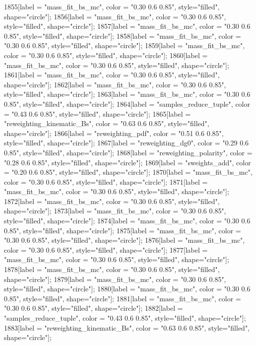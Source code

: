 {	1855[label = "mass_fit_bs_mc", color = "0.30 0.6 0.85", style="filled", shape="circle"];
	1856[label = "mass_fit_bs_mc", color = "0.30 0.6 0.85", style="filled", shape="circle"];
	1857[label = "mass_fit_bs_mc", color = "0.30 0.6 0.85", style="filled", shape="circle"];
	1858[label = "mass_fit_bs_mc", color = "0.30 0.6 0.85", style="filled", shape="circle"];
	1859[label = "mass_fit_bs_mc", color = "0.30 0.6 0.85", style="filled", shape="circle"];
	1860[label = "mass_fit_bs_mc", color = "0.30 0.6 0.85", style="filled", shape="circle"];
	1861[label = "mass_fit_bs_mc", color = "0.30 0.6 0.85", style="filled", shape="circle"];
	1862[label = "mass_fit_bs_mc", color = "0.30 0.6 0.85", style="filled", shape="circle"];
	1863[label = "mass_fit_bs_mc", color = "0.30 0.6 0.85", style="filled", shape="circle"];
	1864[label = "samples_reduce_tuple", color = "0.43 0.6 0.85", style="filled", shape="circle"];
	1865[label = "reweighting_kinematic_Bs", color = "0.63 0.6 0.85", style="filled", shape="circle"];
	1866[label = "reweighting_pdf", color = "0.51 0.6 0.85", style="filled", shape="circle"];
	1867[label = "reweighting_dg0", color = "0.29 0.6 0.85", style="filled", shape="circle"];
	1868[label = "reweighting_polarity", color = "0.28 0.6 0.85", style="filled", shape="circle"];
	1869[label = "sweights_add", color = "0.20 0.6 0.85", style="filled", shape="circle"];
	1870[label = "mass_fit_bs_mc", color = "0.30 0.6 0.85", style="filled", shape="circle"];
	1871[label = "mass_fit_bs_mc", color = "0.30 0.6 0.85", style="filled", shape="circle"];
	1872[label = "mass_fit_bs_mc", color = "0.30 0.6 0.85", style="filled", shape="circle"];
	1873[label = "mass_fit_bs_mc", color = "0.30 0.6 0.85", style="filled", shape="circle"];
	1874[label = "mass_fit_bs_mc", color = "0.30 0.6 0.85", style="filled", shape="circle"];
	1875[label = "mass_fit_bs_mc", color = "0.30 0.6 0.85", style="filled", shape="circle"];
	1876[label = "mass_fit_bs_mc", color = "0.30 0.6 0.85", style="filled", shape="circle"];
	1877[label = "mass_fit_bs_mc", color = "0.30 0.6 0.85", style="filled", shape="circle"];
	1878[label = "mass_fit_bs_mc", color = "0.30 0.6 0.85", style="filled", shape="circle"];
	1879[label = "mass_fit_bs_mc", color = "0.30 0.6 0.85", style="filled", shape="circle"];
	1880[label = "mass_fit_bs_mc", color = "0.30 0.6 0.85", style="filled", shape="circle"];
	1881[label = "mass_fit_bs_mc", color = "0.30 0.6 0.85", style="filled", shape="circle"];
	1882[label = "samples_reduce_tuple", color = "0.43 0.6 0.85", style="filled", shape="circle"];
	1883[label = "reweighting_kinematic_Bs", color = "0.63 0.6 0.85", style="filled", shape="circle"];
}

